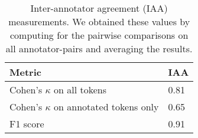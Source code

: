 \documentclass[../report.tex]{subfiles}
\begin{document}
\begin{table}[t]
\begin{tabular}{@{}p{6cm}p{1.25cm}@{}}
\toprule
Metric &  IAA  \\ \midrule
Cohen's $\kappa$ on all tokens & 0.81 \\
Cohen's $\kappa$ on annotated tokens only & 0.65 \\
F1 score & 0.91 \\ \bottomrule
\end{tabular}
\caption{
    Inter-annotator agreement (IAA) measurements.
    We obtained these values by computing for the pairwise comparisons on all annotator-pairs and averaging the results.
}
\label{table:iaa}
\end{table}
\end{document}
